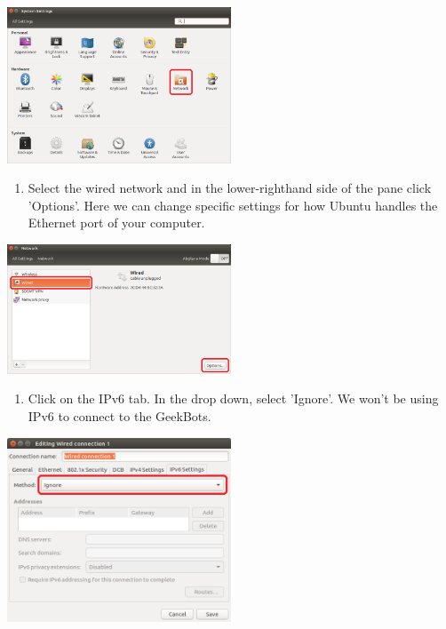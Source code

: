 \includegraphics[width=0.5\textwidth,height=\textheight]{figures/geekbot/eth_config/system_settings.png}

\begin{enumerate}
\def\labelenumi{\arabic{enumi}.}
\setcounter{enumi}{1}
\tightlist
\item
  Select the wired network and in the lower-righthand side of the pane
  click 'Options'. Here we can change specific settings for how Ubuntu
  handles the Ethernet port of your computer.
\end{enumerate}

\includegraphics[width=0.5\textwidth,height=\textheight]{figures/geekbot/eth_config/network_wired.png}

\begin{enumerate}
\def\labelenumi{\arabic{enumi}.}
\setcounter{enumi}{2}
\tightlist
\item
  Click on the IPv6 tab. In the drop down, select 'Ignore'. We won't be
  using IPv6 to connect to the GeekBots.
\end{enumerate}

\includegraphics[width=0.5\textwidth,height=\textheight]{figures/geekbot/eth_config/ipv6_ignore.png}

